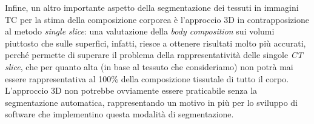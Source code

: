 Infine, un altro importante aspetto della segmentazione dei tessuti in immagini TC per la stima della composizione corporea è l'approccio 3D in contrapposizione al metodo \textit{single slice}: una valutazione della \textit{body composition} sui volumi piuttosto che sulle superfici, infatti, riesce a ottenere risultati molto più accurati, perché permette di superare il problema della rappresentatività delle singole \textit{CT slice}, che per quanto alta (in base al tessuto che consideriamo) non potrà mai essere rappresentativa al 100\% della composizione tissutale di tutto il corpo. L'approccio 3D non potrebbe ovviamente essere praticabile senza la segmentazione automatica, rappresentando un motivo in più per lo sviluppo di software che implementino questa modalità di segmentazione.
